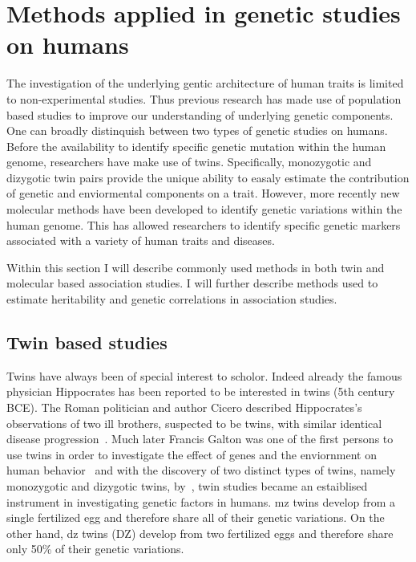 \section{Methods applied in genetic studies on humans}
\label{sec:methods_applied_in_genetic_studies_on_humans}

The investigation of the underlying gentic architecture of human traits is limited to non-experimental studies.
Thus previous research has made use of population based studies to improve our understanding of underlying genetic components.
One can broadly distinquish between two types of genetic studies on humans.
Before the availability to identify specific genetic mutation within the human genome, researchers have make use of twins.
Specifically, monozygotic and dizygotic twin pairs provide the unique ability to easaly estimate the contribution of genetic and enviormental components on a trait.
However, more recently new molecular methods have been developed to identify genetic variations within the human genome.
This has allowed researchers to identify specific genetic markers associated with a variety of human traits and diseases.

Within this section I will describe commonly used methods in both twin and molecular based association studies.
I will further describe methods used to estimate heritability and genetic correlations in association studies.

\subsection{Twin based studies}
\label{sub:twin_based_studies}

Twins have always been of special interest to scholor.
Indeed already the famous physician Hippocrates has been reported to be interested in twins (5th century BCE).
The Roman politician and author Cicero described Hippocrates's observations of two ill brothers, suspected to be twins, with similar identical disease progression~\cite{Cicero44BC}.
Much later Francis Galton was one of the first persons to use twins in order to investigate the effect of genes and the enviornment on human behavior~\cite{Rende1990} and with the discovery of two distinct types of twins, namely monozygotic and dizygotic twins, by~\citet{Simens1924}, twin studies became an estaiblised instrument in investigating genetic factors in humans.
\acrfull{mz} twins develop from a single fertilized egg and therefore share all of their genetic variations.
On the other hand, \acrfull{dz} twins (DZ) develop from two fertilized eggs and therefore share only 50\% of their genetic variations.

